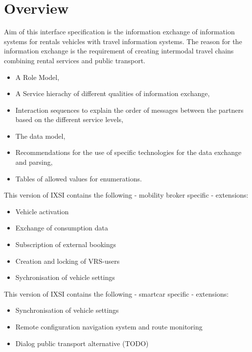 \chapter{Overview}
\label{cha:Zusammenfassung}

Aim of this interface specification is the information exchange of information systems for rentals vehicles with travel information systems.
The reason for the information exchange is the requirement of creating intermodal travel chains combining rental services and public transport.

\begin{itemize}
\item A Role Model,
\item A Service hierachy of different qualities of information exchange,
\item Interaction sequences to explain the order of messages between the partners based on the different service levels,
\item The data model,
\item Recommendations for the use of specific technologies for the data exchange and parsing,
\item Tables of allowed values for enumerations.
\end{itemize}
This version of IXSI contains the following - mobility broker specific - extensions:
\begin{itemize}
	\item Vehicle activation 
	\item Exchange of consumption data 
	\item Subscription of external bookings
	\item Creation and locking of VRS-users
	\item Sychronisation of vehicle settings 
\end{itemize}
This version of IXSI contains the following -  smartcar specific - extensions:
\begin{itemize}
	\item Synchronisation of vehicle settings
	\item Remote configuration navigation system and route monitoring
	\item Dialog public transport alternative (TODO)
\end{itemize}
